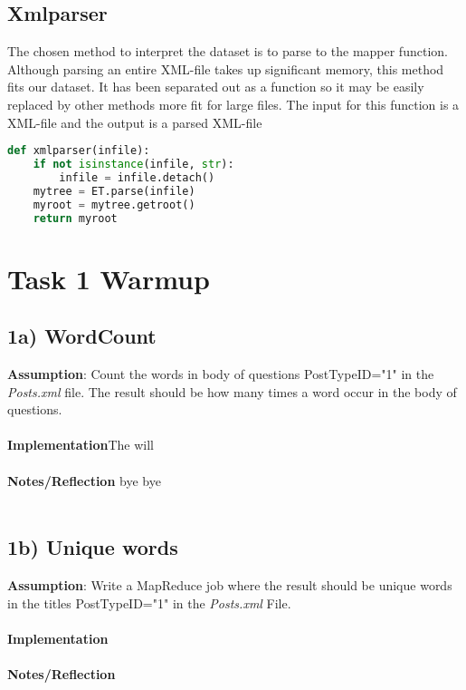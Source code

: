 \documentclass[fleqn,10pt]{wlscirep}
\begin{document}
\subsection*{Xmlparser}
The chosen method to interpret the dataset is to parse to the mapper function. Although parsing an entire XML-file takes up significant memory, this method fits our dataset. It has been separated out as a function so it may be easily replaced by other methods more fit for large files. The input for this function is a XML-file and the output is a parsed XML-file

\begin{lstlisting}[language=Python, caption=xmlparser function]
def xmlparser(infile):
    if not isinstance(infile, str):
        infile = infile.detach()
    mytree = ET.parse(infile)
    myroot = mytree.getroot()
    return myroot
\end{lstlisting}
\section*{Task 1 Warmup}
\subsection*{1a) WordCount}
\textbf{Assumption}: Count the words in body of questions PostTypeID="1"  in the \textit{Posts.xml}  file. The result should be how many times a word occur in the body of questions.\\ \\
\textbf{Implementation}The will  \\ \\
\textbf{Notes/Reflection} bye bye  \\ \\



\subsection*{1b) Unique words}
\textbf{Assumption}: Write a MapReduce job where the result should be unique words in the titles PostTypeID="1" in the \textit{Posts.xml} File. \\ \\
\textbf{Implementation}  \\ \\
\textbf{Notes/Reflection}

\end{document}
